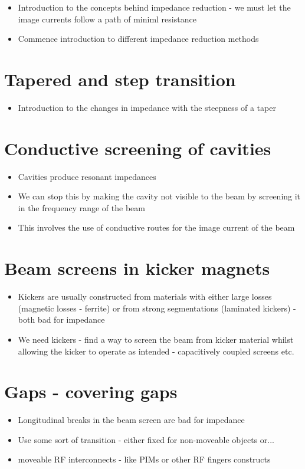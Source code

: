 \begin{itemize}
\item{Introduction to the concepts behind impedance reduction - we must let the image currents follow a path of miniml resistance}
\item{Commence introduction to different impedance reduction methods}
\end{itemize}
\begin{enumerate}

\section{Tapered and step transition}
\begin{itemize}
\item{Introduction to the changes in impedance with the steepness of a taper}
\end{itemize}

\section{Conductive screening of cavities}
\begin{itemize}
\item{Cavities produce resonant impedances}
\item{We can stop this by making the cavity not visible to the beam by screening it in the frequency range of the beam}
\item{This involves the use of conductive routes for the image current of the beam}
\end{itemize}

\section{Beam screens in kicker magnets}
\begin{itemize}
\item{Kickers are usually constructed from materials with either large losses (magnetic losses - ferrite) or from strong segmentations (laminated kickers) - both bad for impedance}
\item{We need kickers - find a way to screen the beam from kicker material whilst allowing the kicker to operate as intended - capacitively coupled screens etc.}
\end{itemize}

\section{Gaps - covering gaps}
\begin{itemize}
\item{Longitudinal breaks in the beam screen are bad for impedance}
\item{Use some sort of transition - either fixed for non-moveable objects or...}
\item{moveable RF interconnects - like PIMs or other RF fingers constructs}
\end{itemize}


\end{enumerate}
